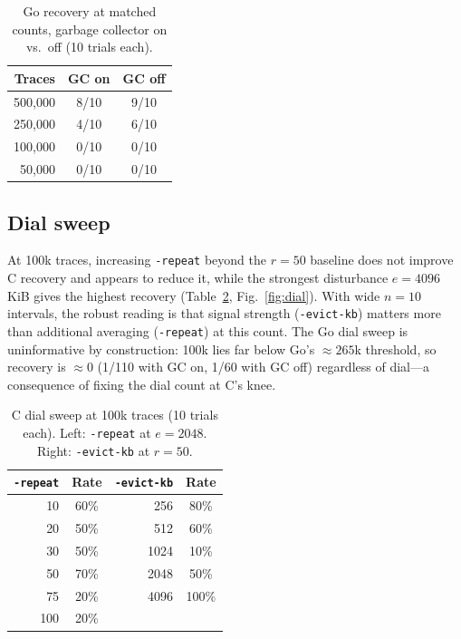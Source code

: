 \documentclass[11pt]{article}
\begin{document}
\begin{table}[t]
\centering
\caption{Go recovery at matched counts, garbage collector on vs.\ off
(10 trials each).}
\label{tab:gc}
\begin{tabular}{rcc}
\toprule
Traces & GC on & GC off \\
\midrule
500{,}000 & 8/10 & 9/10 \\
250{,}000 & 4/10 & 6/10 \\
100{,}000 & 0/10 & 0/10 \\
50{,}000  & 0/10 & 0/10 \\
\bottomrule
\end{tabular}
\end{table}

\subsection{Dial sweep}
\label{sec:res-dial}
At 100k traces, increasing \texttt{-repeat} beyond the $r{=}50$ baseline does not
improve C recovery and appears to reduce it, while the strongest disturbance
$e{=}4096$\,KiB gives the highest recovery (Table~\ref{tab:dial},
Fig.~\ref{fig:dial}). With wide $n{=}10$ intervals, the robust reading is that
signal strength (\texttt{-evict-kb}) matters more than additional averaging
(\texttt{-repeat}) at this count. The Go dial sweep is uninformative by
construction: 100k lies far below Go's $\approx265$k threshold, so recovery is
$\approx0$ (1/110 with GC on, 1/60 with GC off) regardless of dial---a
consequence of fixing the dial count at C's knee.

\begin{table}[t]
\centering
\caption{C dial sweep at 100k traces (10 trials each). Left: \texttt{-repeat} at
$e{=}2048$. Right: \texttt{-evict-kb} at $r{=}50$.}
\label{tab:dial}
\begin{tabular}{rc@{\hskip 2em}rc}
\toprule
\texttt{-repeat} & Rate & \texttt{-evict-kb} & Rate \\
\midrule
10  & 60\% & 256  & 80\%  \\
20  & 50\% & 512  & 60\%  \\
30  & 50\% & 1024 & 10\%  \\
50  & 70\% & 2048 & 50\%  \\
75  & 20\% & 4096 & 100\% \\
100 & 20\% &      &       \\
\bottomrule
\end{tabular}
\end{table}
\end{document}
